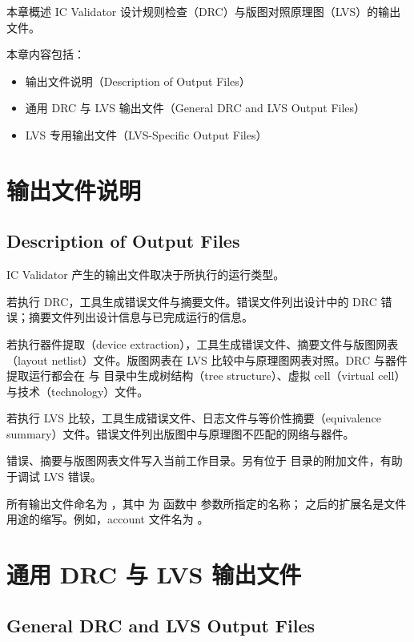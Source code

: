 \label{chap:output}

本章概述 IC Validator 设计规则检查（DRC）与版图对照原理图（LVS）的输出文件。

本章内容包括：
\begin{itemize}
  \item 输出文件说明（Description of Output Files）
  \item 通用 DRC 与 LVS 输出文件（General DRC and LVS Output Files）
  \item LVS 专用输出文件（LVS-Specific Output Files）
\end{itemize}

\section{输出文件说明}
\subsection*{Description of Output Files}

IC Validator 产生的输出文件取决于所执行的运行类型。

若执行 DRC，工具生成错误文件与摘要文件。错误文件列出设计中的 DRC 错误；摘要文件列出设计信息与已完成运行的信息。

若执行器件提取（device extraction），工具生成错误文件、摘要文件与版图网表（layout netlist）文件。版图网表在 LVS 比较中与原理图网表对照。DRC 与器件提取运行都会在  与  目录中生成树结构（tree structure）、虚拟 cell（virtual cell）与技术（technology）文件。

若执行 LVS 比较，工具生成错误文件、日志文件与等价性摘要（equivalence summary）文件。错误文件列出版图中与原理图不匹配的网络与器件。

错误、摘要与版图网表文件写入当前工作目录。另有位于  目录的附加文件，有助于调试 LVS 错误。

所有输出文件命名为 ，其中  为  函数中  参数所指定的名称； 之后的扩展名是文件用途的缩写。例如，account 文件名为 。

\section{通用 DRC 与 LVS 输出文件}
\subsection*{General DRC and LVS Output Files}

